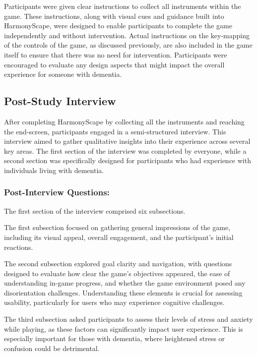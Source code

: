 \documentclass{l4proj}
\begin{document}
Participants were given clear instructions to collect all instruments within the game. These instructions, along with visual cues and guidance built into HarmonyScape, were designed to enable participants to complete the game independently and without intervention. Actual instructions on the key-mapping of the controls of the game, as discussed previously, are also included in the game itself to ensure that there was no need for intervention. Participants were encouraged to evaluate any design aspects that might impact the overall experience for someone with dementia.

\subsection{Post-Study Interview}
After completing HarmonyScape by collecting all the instruments and reaching the end-screen, participants engaged in a semi-structured interview. This interview aimed to gather qualitative insights into their experience across several key areas.  The first section of the interview was completed by everyone, while a second section was specifically designed for participants who had experience with individuals living with dementia.

\subsubsection{Post-Interview Questions:}
The first section of the interview comprised six subsections. 

The first subsection focused on gathering general impressions of the game, including its visual appeal, overall engagement, and the participant's initial reactions.  %

The second subsection explored goal clarity and navigation, with questions designed to evaluate how clear the game's objectives appeared, the ease of understanding in-game progress, and whether the game environment posed any disorientation challenges.  Understanding these elements is crucial for assessing usability,  particularly for users who may experience cognitive challenges.  

The third subsection asked participants to assess their levels of stress and anxiety while playing, as these factors can significantly impact user experience. This is especially important for those with dementia, where heightened stress or confusion could be detrimental.
\end{document}
